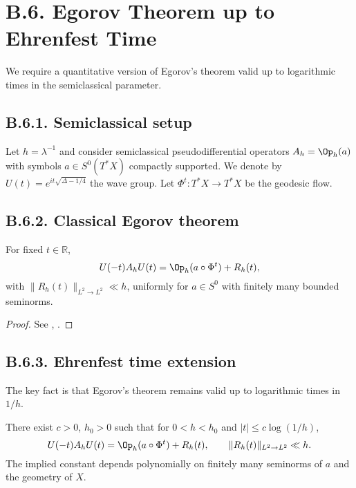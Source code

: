 \section{B.6. Egorov Theorem up to Ehrenfest Time}\label{sec:B6}

We require a quantitative version of Egorov’s theorem valid up to logarithmic times in the semiclassical parameter.

\subsection*{B.6.1. Semiclassical setup}

Let $h=\lambda^{-1}$ and consider semiclassical pseudodifferential operators $A_h=\Op_h(a)$ with symbols $a\in S^0(T^*X)$ compactly supported.
We denote by $U(t)=e^{it\sqrt{\Delta-1/4}}$ the wave group.
Let $\Phi^t:T^*X\to T^*X$ be the geodesic flow.

\subsection*{B.6.2. Classical Egorov theorem}

\begin{theorem}[Egorov]\label{thm:B6-classical}
For fixed $t\in\mathbb{R}$,
\[
U(-t)A_hU(t)=\Op_h(a\circ \Phi^t)+R_h(t),
\]
with $\|R_h(t)\|_{L^2\to L^2}\ll h$, uniformly for $a\in S^0$ with finitely many bounded seminorms.
\end{theorem}

\begin{proof}
See \cite[Ch.~11]{Zworski}, \cite[Ch.~IV]{Sogge}.
\end{proof}

\subsection*{B.6.3. Ehrenfest time extension}

The key fact is that Egorov’s theorem remains valid up to logarithmic times in $1/h$.

\begin{theorem}\label{thm:B6-ehrenfest}
There exist $c>0$, $h_0>0$ such that for $0<h<h_0$ and $|t|\le c\log(1/h)$,
\begin{equation}\label{eq:B6-egorov}
U(-t)A_hU(t)=\Op_h(a\circ \Phi^t)+R_h(t),
\qquad \|R_h(t)\|_{L^2\to L^2}\ll h.
\end{equation}
The implied constant depends polynomially on finitely many seminorms of $a$ and the geometry of $X$.
\end{theorem}


